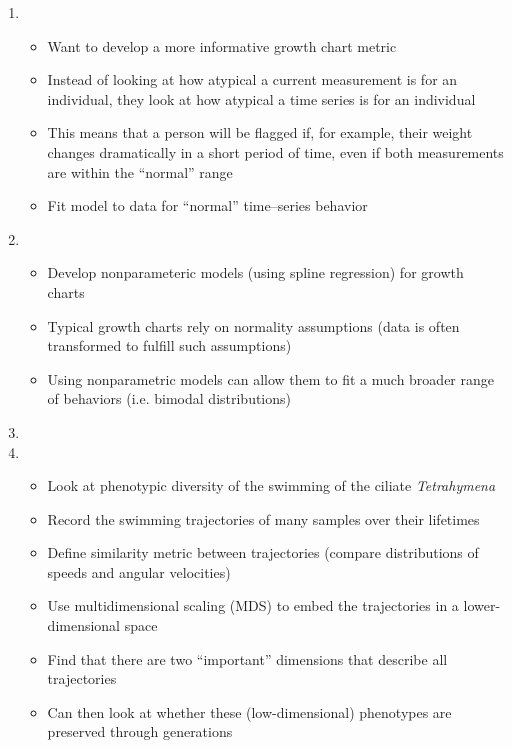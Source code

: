 \documentclass[12pt]{article}
\begin{document}
\begin{enumerate}

\item {}
\begin{itemize}
		\item Want to develop a more informative growth chart metric
		\item Instead of looking at how atypical a current measurement is for an individual, they look at how atypical a time series is for an individual 
		\item This means that a person will be flagged if, for example, their weight changes dramatically in a short period of time, even if both measurements are within the ``normal'' range
		\item Fit model to data for ``normal'' time--series behavior
\end{itemize}

\item {}
\begin{itemize}
	\item Develop nonparameteric models (using spline regression) for growth charts
	\item Typical growth charts rely on normality assumptions (data is often transformed to fulfill such assumptions)
	\item Using nonparametric models can allow them to fit a much broader range of behaviors (i.e. bimodal distributions)
\end{itemize}

\item {}

\item {}
\begin{itemize}
	\item Look at phenotypic diversity of the swimming of the ciliate {\em Tetrahymena}
	\item Record the swimming trajectories of many samples over their lifetimes
	\item Define similarity metric between trajectories (compare distributions of speeds and angular velocities)
	\item Use multidimensional scaling (MDS) to embed the trajectories in a lower-dimensional space
	\item Find that there are two ``important'' dimensions that describe all trajectories
	\item Can then look at whether these (low-dimensional) phenotypes are preserved through generations
\end{itemize}


\end{enumerate}
\end{document}
